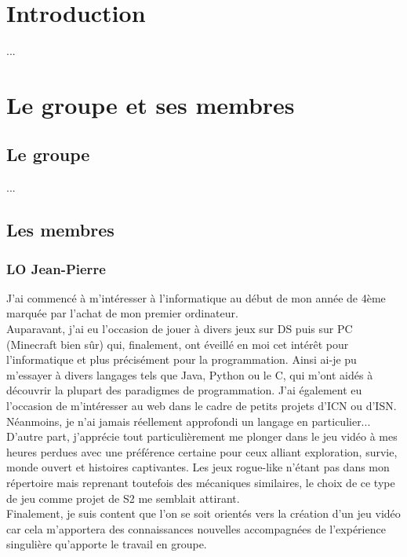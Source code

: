 \documentclass{article}
\title{
    \textbf{ \begin{center} \Huge Cahier des charges \end{center} }
    \textrm{ \underline{Groupe:} Sépanou }
}
\author{
    LO Jean-Pierre | MICHALON Loïc \and
    MICHOT Maxence | TCHEKACHEV David
}
\date{Janvier 2021}
\begin{document}
\maketitle

\pagebreak

\renewcommand*\contentsname{\textbf{\Huge Sommaire \newline}}
\large \tableofcontents

\pagebreak
\normalsize
\section{Introduction}

...

\pagebreak

\section{Le groupe et ses membres}

\subsection{Le groupe}

...

\subsection{Les membres}

\subsubsection{LO Jean-Pierre}

J'ai commencé à m'intéresser à l'informatique au début de mon année de 4ème marquée par l'achat de mon premier ordinateur. \\
Auparavant, j'ai eu l'occasion de jouer à divers jeux sur DS puis sur PC (Minecraft bien sûr) qui, finalement, ont éveillé en moi cet intérêt pour l'informatique et plus précisément pour la programmation.
Ainsi ai-je pu m'essayer à divers langages tels que Java, Python ou le C, qui m'ont aidés à découvrir la plupart des paradigmes de programmation. J'ai également eu l'occasion de m'intéresser au web dans le cadre de petits projets d'ICN ou d'ISN. \\
Néanmoins, je n'ai jamais réellement approfondi un langage en particulier... \\
D'autre part, j'apprécie tout particulièrement me plonger dans le jeu vidéo à mes heures perdues avec une préférence certaine pour ceux alliant exploration, survie, monde ouvert et histoires captivantes. Les jeux rogue-like n'étant pas dans mon répertoire mais reprenant toutefois des mécaniques similaires, le choix de ce type de jeu comme projet de S2 me semblait attirant. \\
Finalement, je suis content que l'on se soit orientés vers la création d'un jeu vidéo car cela m'apportera des connaissances nouvelles accompagnées de l'expérience singulière qu'apporte le travail en groupe.
\end{document}
